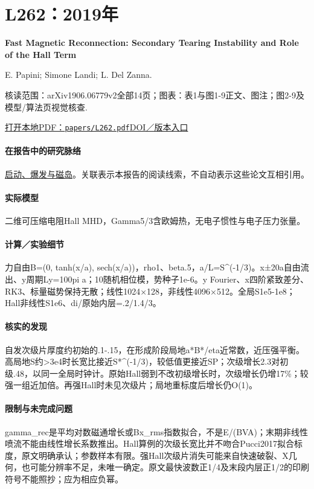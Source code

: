 \documentclass[UTF8,a4paper,11pt,openany,fontset=fandol]{ctexbook}
\begin{document}
\section{L262：2019年}\label{paper:L262}

\textbf{Fast Magnetic Reconnection: Secondary Tearing Instability and Role of the Hall Term}\citep{L262}\

E. Papini;  Simone Landi;  L. Del Zanna.

\textsf{核读范围：}arXiv1906.06779v2全部14页；\textsf{图表：}表1与图1-9正文、图注；图2-9及模型/算法页视觉核查.

\href{run:../papers/L262.pdf}{打开本地PDF：\texttt{papers/L262.pdf}}\quad\href{https://doi.org/10.3847/1538-4357/ab4352}{DOI／版本入口}

\paragraph{在报告中的研究脉络}\hyperref[story:onset]{启动、爆发与磁岛}。关联表示本报告的阅读线索，不自动表示这些论文互相引用。

\paragraph{实际模型}二维可压缩电阻Hall MHD，Gamma5/3含欧姆热，无电子惯性与电子压力张量。

\paragraph{计算／实验细节}力自由B=(0, tanh(x/a), sech(x/a))，rho1、beta.5，a/L=S\textasciicircum{}(-1/3)。x±20a自由流出、y周期Ly=100pi a；10随机相位模，势种子1e-6。y Fourier、x四阶紧致差分、RK3、标量磁势保持无散；线性1024×128，非线性4096×512。全局S1e5-1e8；Hall非线性S1e6、di/原始内层=.2/1.4/3。

\paragraph{核实的发现}自发次级片厚度约初始的.1-.15，在形成阶段局地a*B*/eta近常数，近压强平衡。高局地S约>3e4时长宽比接近S*\textasciicircum{}(-1/3)，较低值更接近SP；次级增长2.3对初级.48，以同一全局时钟计。原始Hall弱到不改初级增长时，次级增长仍增17\%；较强一组近加倍。再强Hall时未见次级片；局地重标度后增长仍O(1)。

\paragraph{限制与未完成问题}gamma\_rec是平均对数磁通增长或Bx\_rms指数拟合，不是E/(BVA)；末期非线性喷流不能由线性增长系数推出。Hall算例的次级长宽比并不吻合Pucci2017拟合标度，原文明确承认；参数样本有限。强Hall次级片消失可能来自快速破裂、X几何，也可能分辨率不足，未唯一确定。原文最快波数正1/4及末段内层正1/2的印刷符号不能照抄；应为相应负幂。
\end{document}
